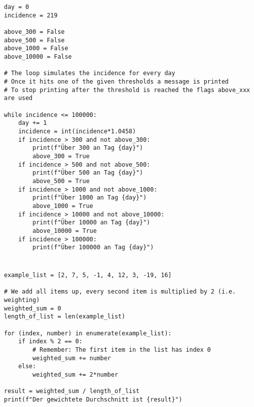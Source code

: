 \documentclass[a4paper]{article}
\begin{document}




\section{}
\begin{verbatim}
day = 0
incidence = 219

above_300 = False
above_500 = False
above_1000 = False
above_10000 = False

# The loop simulates the incidence for every day
# Once it hits one of the given thresholds a message is printed
# To stop printing after the threshold is reached the flags above_xxx are used

while incidence <= 100000:
    day += 1
    incidence = int(incidence*1.0458)
    if incidence > 300 and not above_300:
        print(f"Über 300 an Tag {day}")
        above_300 = True
    if incidence > 500 and not above_500:
        print(f"Über 500 an Tag {day}")
        above_500 = True
    if incidence > 1000 and not above_1000:
        print(f"Über 1000 an Tag {day}")
        above_1000 = True
    if incidence > 10000 and not above_10000:
        print(f"Über 10000 an Tag {day}")
        above_10000 = True
    if incidence > 100000:
        print(f"Über 100000 an Tag {day}")

\end{verbatim}

\section{}
\begin{verbatim}
example_list = [2, 7, 5, -1, 4, 12, 3, -19, 16]

# We add all items up, every second item is multiplied by 2 (i.e. weighting)
weighted_sum = 0
length_of_list = len(example_list)

for (index, number) in enumerate(example_list):
    if index % 2 == 0:
        # Remember: The first item in the list has index 0
        weighted_sum += number
    else:
        weighted_sum += 2*number

result = weighted_sum / length_of_list
print(f"Der gewichtete Durchschnitt ist {result}")
\end{verbatim}

\newpage
\end{document}
